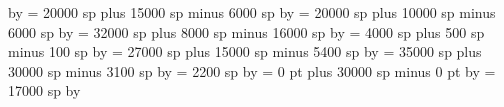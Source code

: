 {\multiply\spacearoundminor by \grefactor %
%
\spacearoundmaior = 20000 sp plus 15000 sp minus 6000 sp%
\multiply\spacearoundmaior by \grefactor %
%
\spacearoundfinalis = 20000 sp plus 10000 sp minus 6000 sp%
\multiply\spacearoundfinalis by \grefactor %
%
\spacebeforefinalfinalis= 32000 sp plus 8000 sp minus 16000 sp%
\multiply\spacebeforefinalfinalis by \grefactor %
%
\spacearoundclefbars= 4000 sp plus 500 sp minus 100 sp%
\multiply\spacearoundclefbars by \grefactor %
%
\textbartextspace = 27000 sp plus 15000 sp minus 5400 sp%
\multiply\textbartextspace by \grefactor %
%
\notebarspace = 35000 sp plus 30000 sp minus 3100 sp%
\multiply\notebarspace by \grefactor %
%
\maximumspacewithoutdash = 2200 sp%
\multiply\maximumspacewithoutdash by \grefactor %
%
\afterclefnospace = 0 pt plus 30000 sp minus 0 pt%
\multiply\afterclefnospace by \grefactor %
%
\additionallineswidth = 17000 sp%
\multiply\additionallineswidth by \grefactor %
%
\relax %
}
